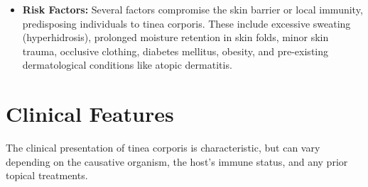 \begin{itemize}
    \item \textbf{Risk Factors:} Several factors compromise the skin barrier or local immunity, predisposing individuals to tinea corporis. These include excessive sweating (hyperhidrosis), prolonged moisture retention in skin folds, minor skin trauma, occlusive clothing, diabetes mellitus, obesity, and pre-existing dermatological conditions like atopic dermatitis.
\end{itemize}

\section*{Clinical Features}
The clinical presentation of tinea corporis is characteristic, but can vary depending on the causative organism, the host's immune status, and any prior topical treatments.

